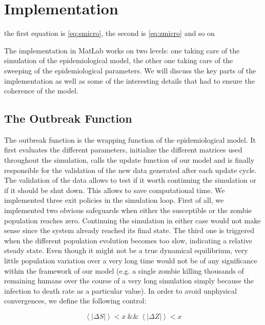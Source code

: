\documentclass[11pt]{article} %
\begin{document}
\section{Implementation}\indent

the first equation is \eqref{eq:smicro}, the second is \eqref{eq:zmicro} and so on

The implementation in MatLab works on two levels: one taking care of the simulation of the epidemiological model, the other one taking care of the sweeping of the epidemiological parameters. We will discuss the key parts of the implementation as well as some of the interesting details that had to ensure the coherence of the model.


\subsection{The Outbreak Function}\indent

The outbreak function is the wrapping function of the epidemiological model. It first evaluates the different parameters, initialize the different matrices used throughout the simulation, calls the update function of our model and is finally responsible for the validation of the new data generated after each update cycle. The validation of the data allows to test if it worth continuing the simulation or if it should be shut down. This allows to save computational time. We implemented three exit policies in the simulation loop. First of all, we implemented two obvious safeguards when either the susceptible or the zombie population reaches zero. Continuing the simulation in either case would not make sense since the system already reached its final state. The third one is triggered when the different population evolution becomes too slow, indicating a relative steady state. Even though it might not be a true dynamical equilibrium, very little population variation over a very long time would not be of any significance within the framework of our model (e.g. a single zombie killing thousands of remaining humans over the course of a very long simulation simply because the infection to death rate as a particular value). In order to avoid unphysical convergences, we define the following control:

\begin{equation} \label{eq:outbreakequilibrium}
\left\langle \left| \Delta S \right| \right\rangle < x\ \&\&\ \left\langle\left|\Delta Z \right| \right\rangle < x
\end{equation}
\end{document}
